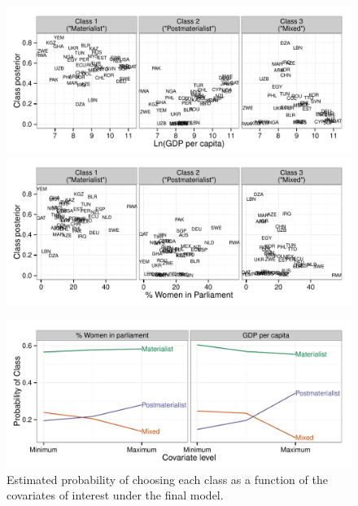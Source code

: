 \documentclass[letterpaper,12pt]{article}
\begin{document}
\begin{figure}
	\includegraphics[width=\textwidth]{figures/gdp-posterior.pdf}
	
	\includegraphics[width=\textwidth]{figures/women-posterior.pdf}

	\caption{\label{fig:posterior}}
\end{figure}
\fi


\begin{figure}
	\includegraphics[width=\textwidth]{figures/covariates.pdf}
	\caption{\label{fig:covariates}Estimated probability of choosing each class as a function of the covariates of interest under the final model.}
\end{figure}
\end{document}
